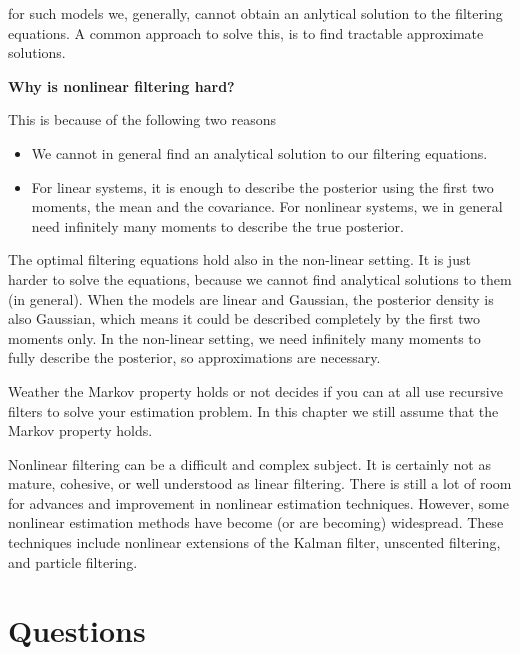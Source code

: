 for such models we, generally, cannot obtain an anlytical solution to the filtering equations. A common approach to solve this, is to find tractable approximate solutions.


\begin{framed}
\theoremstyle{remark}
\begin{remark}{\textbf{Why is nonlinear filtering hard?}}

This is because of the following two reasons

\begin{itemize}
\item We cannot in general find an analytical solution to our filtering equations.
\item For linear systems, it is enough to describe the posterior using the first two moments, the mean and the covariance. For nonlinear systems, 
we in general need infinitely many moments to describe the true posterior.
\end{itemize}

The optimal filtering equations hold also in the non-linear setting. It is just harder to solve the equations, because we cannot find 
analytical solutions to them (in general). When the models are linear and Gaussian, the posterior density 
is also Gaussian, which means it could be described completely by the first two moments only. 
In the non-linear setting, we need infinitely many moments to fully describe the posterior, so approximations are necessary.

Weather the Markov property holds or not decides if you can at all use recursive filters to solve your estimation problem. 
In this chapter we still assume that the Markov property holds.
\end{remark}
\end{framed} 

Nonlinear filtering can be a difficult and complex subject.  It is certainly not as 
mature, cohesive, or well understood  as linear filtering. There is still a lot of  room 
for advances and improvement in nonlinear estimation techniques.  However, some 
nonlinear  estimation methods have become  (or are becoming) widespread.  These 
techniques  include nonlinear  extensions of  the Kalman filter,  unscented  filtering, 
and particle filtering. 


\section{Questions}

